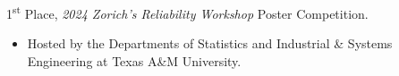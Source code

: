
\vspace{5pt}
1\textsuperscript{st} Place, \textit{2024 Zorich's Reliability Workshop} Poster Competition.
\begin{itemize}[leftmargin=*]
    \item Hosted by the Departments of Statistics and Industrial \& Systems Engineering at Texas A\&M University.
\end{itemize}

